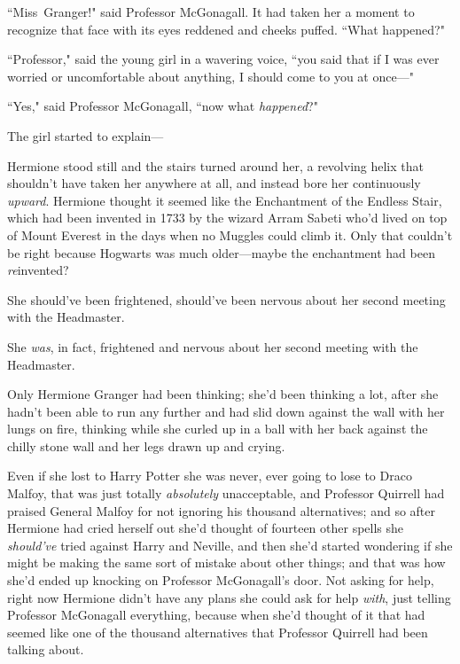 ``Miss~Granger!" said Professor McGonagall. It had taken her a moment to recognize that face with its eyes reddened and cheeks puffed. ``What happened?"

``Professor," said the young girl in a wavering voice, ``you said that if I was ever worried or uncomfortable about anything, I should come to you at once---"

``Yes," said Professor McGonagall, ``now what \emph{happened}?"

The girl started to explain---

\later

Hermione stood still and the stairs turned around her, a revolving helix that shouldn't have taken her anywhere at all, and instead bore her continuously \emph{upward}. Hermione thought it seemed like the Enchantment of the Endless Stair, which had been invented in 1733 by the wizard Arram Sabeti who'd lived on top of Mount Everest in the days when no Muggles could climb it. Only that couldn't be right because Hogwarts was much older---maybe the enchantment had been \emph{re}invented?

She should've been frightened, should've been nervous about her second meeting with the Headmaster.

She \emph{was}, in fact, frightened and nervous about her second meeting with the Headmaster.

Only Hermione Granger had been thinking; she'd been thinking a lot, after she hadn't been able to run any further and had slid down against the wall with her lungs on fire, thinking while she curled up in a ball with her back against the chilly stone wall and her legs drawn up and crying.

Even if she lost to Harry Potter she was never, ever going to lose to Draco Malfoy, that was just totally \emph{absolutely} unacceptable, and Professor Quirrell had praised General Malfoy for not ignoring his thousand alternatives; and so after Hermione had cried herself out she'd thought of fourteen other spells she \emph{should've} tried against Harry and Neville, and then she'd started wondering if she might be making the same sort of mistake about other things; and that was how she'd ended up knocking on Professor McGonagall's door. Not asking for help, right now Hermione didn't have any plans she could ask for help \emph{with}, just telling Professor McGonagall everything, because when she'd thought of it that had seemed like one of the thousand alternatives that Professor Quirrell had been talking about.

